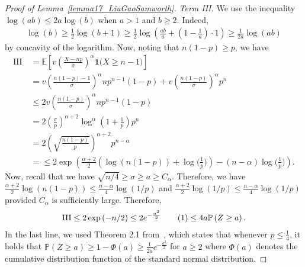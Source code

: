 \documentclass{article}
\newcommand{\one}{\mathbf{1}}
\newcommand\numberthis{\addtocounter{equation}{1}\tag{\theequation}}
\begin{document}
\begin{proof}[Proof of Lemma~\ref{lemma17_LiuGaoSamworth}]
\textit{Term III.} We use the inequality $\log(ab) \leq 2a \log(b)$ when $a >1$ and $b \geq 2$. Indeed, 
\begin{align*}
\log(b ) \geq \frac{1}{2}\log\left(b+1 \right) \geq \frac{1}{2} \log\left(\frac{ab}{a} + (1-\frac{1}{a})\cdot 1\right) \geq \frac{1}{2a} \log\left(ab\right)
\end{align*}
by concavity of the logarithm.  
Now, noting that $n(1-p) \geq p$, we have
\begin{align*}
\text{III} ~& =\mathbb E\left[v\!\left(\frac{X-np}{\sigma}\right)^\alpha \one{\big(X  \geq n-1 \big)}\right] \\
&= v\!\left(\frac{n(1-p)-1}{\sigma}\right)^\alpha n p^{n-1}(1-p) + v \!\left(\frac{n(1-p)}{\sigma}\right)^\alpha p^n\\
& \leq  2v\!\left(\frac{n(1-p)}{\sigma}\right)^\alpha n p^{n-1}(1-p) \\
& = 2 \left(\frac{\sigma}{p}\right)^{\alpha+2}\log^\alpha\left(1+\frac{1}{p}\right) p^{n}\\
& = 2 \left(\sqrt{\frac{n(1-p)}{p}}\right)^{\alpha+2}  p^{n-\alpha}\\
& =
\leq 2 \exp\left(\frac{\alpha + 2}{2}\left(\log(n(1-p)) + \log\Big(\frac{1}{p}\Big)\right) - (n-\alpha)\log\Big(\frac{1}{p}\Big)\right).
\end{align*}
Now, recall that we have $\sqrt{n/4} \geq \sigma \geq a \geq C_\alpha$. 
Therefore, we have $\frac{\alpha + 2}{2}\log(n(1-p))\leq \frac{n-\alpha}{4} \log\left(1/p\right)$ and $\frac{\alpha + 2}{2}\log(1/p) \leq \frac{n-\alpha}{4} \log\left(1/p\right)$ provided $C_\alpha$ is sufficiently large. Therefore,
\begin{align*}
    \text{III} \leq 2 \exp\left(-n/2\right) \leq 2 e^{-\frac{a^2}{2}}\numberthis \leq 4a \mathbb P\left(Z \geq a\right).\label{eq_term_III}
\end{align*}
In the last line, we used Theorem 2.1 from~\cite{slud1977distribution}, which states that whenever $p \leq \frac{1}{4}$, it holds that $\mathbb P(Z \geq a) \geq 1 - \Phi(a) \geq \frac{1}{2a} e^{-\frac{a^2}{2}}$ for $a \geq 2$ where $\Phi(a)$ denotes the cumulative distribution function of the standard normal distribution.


\end{proof}
\end{document}
